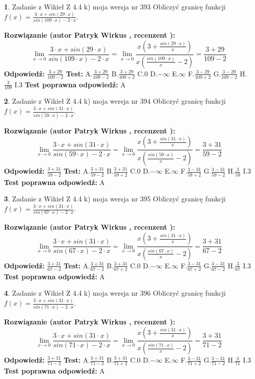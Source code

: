 \documentclass[12pt, a4paper]{article}
\theoremstyle{definition} %
\newtheorem{zad}{}
\newcommand{\zadStart}[1]{\begin{zad}#1\newline}
\newcommand{\zadStop}{\end{zad}}
\newcommand{\rozwStart}[2]{\noindent \textbf{Rozwiązanie (autor #1 , recenzent #2): }\newline}
\newcommand{\rozwStop}{\newline}
\newcommand{\odpStart}{\noindent \textbf{Odpowiedź:}\newline}
\newcommand{\odpStop}{\newline}
\newcommand{\testStart}{\noindent \textbf{Test:}\newline}
\newcommand{\testStop}{\newline}
\newcommand{\kluczStart}{\noindent \textbf{Test poprawna odpowiedź:}\newline}
\newcommand{\kluczStop}{\newline}
\begin{document}
\zadStart{Zadanie z Wikieł Z 4.4 k) moja wersja nr 393}
Obliczyć granicę funkcji $f(x)=\frac{3\cdot x +sin(29\cdot x)}{sin(109\cdot x) -2\cdot x}$.
\zadStop
\rozwStart{Patryk Wirkus}{}
$$\lim\limits_{x\to 0}\frac{3\cdot x +sin(29\cdot x)}{sin(109\cdot x) -2\cdot x}
=\lim\limits_{x\to 0}\frac{x(3+\frac{sin(29\cdot x)}{x})}{x(\frac{sin(109\cdot x)}{x}-2)}
=\frac{3+29}{109-2}$$
\rozwStop
\odpStart
$\frac{3+29}{109-2}$
\odpStop
\testStart
A.$\frac{3+29}{109-2}$
B.$\frac{3+29}{109+2}$
C.$0$
D.$-\infty$
E.$\infty$
F.$\frac{3-29}{109+2}$
G.$\frac{3-29}{109-2}$
H.$\frac{3}{109}$
I.$3$
\testStop
\kluczStart
A
\kluczStop



\zadStart{Zadanie z Wikieł Z 4.4 k) moja wersja nr 394}
Obliczyć granicę funkcji $f(x)=\frac{3\cdot x +sin(31\cdot x)}{sin(59\cdot x) -2\cdot x}$.
\zadStop
\rozwStart{Patryk Wirkus}{}
$$\lim\limits_{x\to 0}\frac{3\cdot x +sin(31\cdot x)}{sin(59\cdot x) -2\cdot x}
=\lim\limits_{x\to 0}\frac{x(3+\frac{sin(31\cdot x)}{x})}{x(\frac{sin(59\cdot x)}{x}-2)}
=\frac{3+31}{59-2}$$
\rozwStop
\odpStart
$\frac{3+31}{59-2}$
\odpStop
\testStart
A.$\frac{3+31}{59-2}$
B.$\frac{3+31}{59+2}$
C.$0$
D.$-\infty$
E.$\infty$
F.$\frac{3-31}{59+2}$
G.$\frac{3-31}{59-2}$
H.$\frac{3}{59}$
I.$3$
\testStop
\kluczStart
A
\kluczStop



\zadStart{Zadanie z Wikieł Z 4.4 k) moja wersja nr 395}
Obliczyć granicę funkcji $f(x)=\frac{3\cdot x +sin(31\cdot x)}{sin(67\cdot x) -2\cdot x}$.
\zadStop
\rozwStart{Patryk Wirkus}{}
$$\lim\limits_{x\to 0}\frac{3\cdot x +sin(31\cdot x)}{sin(67\cdot x) -2\cdot x}
=\lim\limits_{x\to 0}\frac{x(3+\frac{sin(31\cdot x)}{x})}{x(\frac{sin(67\cdot x)}{x}-2)}
=\frac{3+31}{67-2}$$
\rozwStop
\odpStart
$\frac{3+31}{67-2}$
\odpStop
\testStart
A.$\frac{3+31}{67-2}$
B.$\frac{3+31}{67+2}$
C.$0$
D.$-\infty$
E.$\infty$
F.$\frac{3-31}{67+2}$
G.$\frac{3-31}{67-2}$
H.$\frac{3}{67}$
I.$3$
\testStop
\kluczStart
A
\kluczStop



\zadStart{Zadanie z Wikieł Z 4.4 k) moja wersja nr 396}
Obliczyć granicę funkcji $f(x)=\frac{3\cdot x +sin(31\cdot x)}{sin(71\cdot x) -2\cdot x}$.
\zadStop
\rozwStart{Patryk Wirkus}{}
$$\lim\limits_{x\to 0}\frac{3\cdot x +sin(31\cdot x)}{sin(71\cdot x) -2\cdot x}
=\lim\limits_{x\to 0}\frac{x(3+\frac{sin(31\cdot x)}{x})}{x(\frac{sin(71\cdot x)}{x}-2)}
=\frac{3+31}{71-2}$$
\rozwStop
\odpStart
$\frac{3+31}{71-2}$
\odpStop
\testStart
A.$\frac{3+31}{71-2}$
B.$\frac{3+31}{71+2}$
C.$0$
D.$-\infty$
E.$\infty$
F.$\frac{3-31}{71+2}$
G.$\frac{3-31}{71-2}$
H.$\frac{3}{71}$
I.$3$
\testStop
\kluczStart
A
\kluczStop
\end{document}
